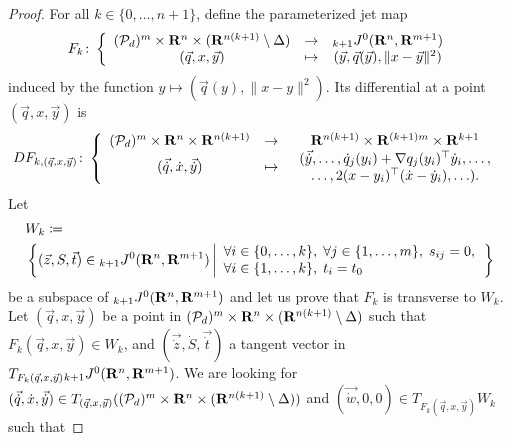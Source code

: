 \begin{proof}
  For all $k \in \{0, \ldots, n + 1\}$, define the parameterized jet map
  \[
    F_k \colon \left\{
    \begin{array}{ccc}
      (\mathcal{P}_d)^m \times \mathbf{R}^n \times (\mathbf{R}^{n(k + 1)} \setminus \Delta)
      & \to
      & {}_{k + 1} J^0(\mathbf{R}^n, \mathbf{R}^{m + 1})
    \\
      (\vec{q}, x, \vec{y})
      & \mapsto
      & (\vec{y}, \vec{q}(\vec{y}), \| x - \vec{y} \|^2)
    \end{array}
    \right.
  \]
  induced by the function $y \mapsto (\vec{q}(y), \| x - y \|^2)$. Its differential at a point $(\vec{q}, x, \vec{y})$ is
  \[
    DF_{k, (\vec{q}, x, \vec{y})} \colon \left\{
    \begin{array}{ccc}
      (\mathcal{P}_d)^m \times \mathbf{R}^n \times \mathbf{R}^{n (k + 1)}
      & \to
      & \mathbf{R}^{n (k + 1)} \times \mathbf{R}^{(k + 1) m} \times \mathbf{R}^{k + 1}
    \\
      (\vec{\dot{q}}, \dot{x}, \vec{\dot{y}})
      & \mapsto
      & \begin{array}{c}
        (\vec{\dot{y}}, \ldots, \dot{q}_j(y_i) + \nabla q_j(y_i)^\top \dot{y}_i, \ldots, \\
        \ldots, 2(x - y_i)^\top (\dot{x} - \dot{y}_i), \ldots).
      \end{array}
    \end{array}
    \right.
  \]
  Let
  \begin{align*}
    & W_k \coloneq \\
    & \left\{
    (\vec z, S, \vec t) \in {}_{k + 1} J^0(\mathbf{R}^n, \mathbf{R}^{m + 1})
    \left|
    \begin{array}{l}
      \forall i \in \{0, \ldots, k\}, \; \forall j \in \{1, \ldots, m\}, \; s_{ij} = 0, \\
      \forall i \in \{1, \ldots, k\}, \; t_i = t_0
    \end{array}
    \right.
    \right\}
  \end{align*}
  be a subspace of ${}_{k + 1} J^0(\mathbf{R}^n, \mathbf{R}^{m + 1})$ and let us prove that $F_k$ is transverse to $W_k$. Let $(\vec{q}, x, \vec{y})$ be a point in $(\mathcal{P}_d)^m \times \mathbf{R}^n \times (\mathbf{R}^{n(k + 1)} \setminus \Delta)$ such that $F_k(\vec{q}, x, \vec{y}) \in W_k$, and $(\vec{\dot{z}}, \dot{S}, \vec{\dot{t}})$ a tangent vector in $T_{F_k(\vec{q}, x, \vec{y})} {}_{k + 1} J^0(\mathbf{R}^n, \mathbf{R}^{m + 1})$. We are looking for $(\vec{\dot{q}}, \dot{x}, \vec{\dot{y}}) \in T_{(\vec{q}, x, \vec{y})} ((\mathcal{P}_d)^m \times \mathbf{R}^n \times (\mathbf{R}^{n(k + 1)} \setminus \Delta))$ and $(\vec{\dot{w}}, 0, 0) \in T_{F_k(\vec{q}, x, \vec{y})} W_k$ such that

\end{proof}
